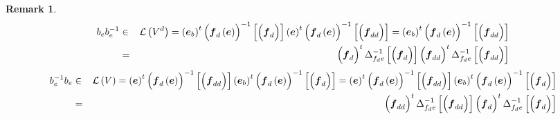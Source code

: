 \documentclass[aps,preprint]{revtex4}
\newtheorem{remark}[theorem]{Remark}
\begin{document}
\begin{remark}
\begin{eqnarray}
b_{e}b_{e}^{-1} &\in &\mathcal{L}\left( V^{d}\right) =\left( \overset{}{%
\boldsymbol{e}_{b}}\right) ^{t}\left( \overset{}{\boldsymbol{f}_{d}\left( 
\boldsymbol{e}\right) }\right) ^{-1}\left[ \left( \overset{}{\boldsymbol{f}%
_{d}}\right) \right] \left( \overset{}{\boldsymbol{e}}\right) ^{t}\left( 
\overset{}{\boldsymbol{f}_{d}\left( \boldsymbol{e}\right) }\right) ^{-1}%
\left[ \left( \overset{}{\boldsymbol{f}_{dd}}\right) \right] =\left( \overset%
{}{\boldsymbol{e}_{b}}\right) ^{t}\left( \overset{}{\boldsymbol{f}_{d}\left( 
\boldsymbol{e}\right) }\right) ^{-1}\left[ \left( \overset{}{\boldsymbol{f}%
_{dd}}\right) \right] \\
&=&\left( \overset{}{\boldsymbol{f}_{d}}\right) ^{t}{\LARGE \Delta }%
_{f_{d}e}^{-1}\left[ \left( \overset{}{\boldsymbol{f}_{d}}\right) \right]
\left( \overset{}{\boldsymbol{f}_{dd}}\right) ^{t}{\LARGE \Delta }%
_{f_{d}e}^{-1}\left[ \left( \overset{}{\boldsymbol{f}_{dd}}\right) \right]
\end{eqnarray}%
\begin{eqnarray}
b_{e}^{-1}b_{e} &\in &\mathcal{L}\left( V\right) =\left( \overset{}{%
\boldsymbol{e}}\right) ^{t}\left( \overset{}{\boldsymbol{f}_{d}\left( 
\boldsymbol{e}\right) }\right) ^{-1}\left[ \left( \overset{}{\boldsymbol{f}%
_{dd}}\right) \right] \left( \overset{}{\boldsymbol{e}_{b}}\right)
^{t}\left( \overset{}{\boldsymbol{f}_{d}\left( \boldsymbol{e}\right) }%
\right) ^{-1}\left[ \left( \overset{}{\boldsymbol{f}_{d}}\right) \right]
=\left( \overset{}{\boldsymbol{e}}\right) ^{t}\left( \overset{}{\boldsymbol{f%
}_{d}\left( \boldsymbol{e}\right) }\right) ^{-1}\left[ \left( \overset{}{%
\boldsymbol{f}_{dd}}\right) \right] \left( \overset{}{\boldsymbol{e}_{b}}%
\right) ^{t}\left( \overset{}{\boldsymbol{f}_{d}\left( \boldsymbol{e}\right) 
}\right) ^{-1}\left[ \left( \overset{}{\boldsymbol{f}_{d}}\right) \right] \\
&=&\left( \overset{}{\boldsymbol{f}_{dd}}\right) ^{t}{\LARGE \Delta }%
_{f_{d}e}^{-1}\left[ \left( \overset{}{\boldsymbol{f}_{dd}}\right) \right]
\left( \overset{}{\boldsymbol{f}_{d}}\right) ^{t}{\LARGE \Delta }%
_{f_{d}e}^{-1}\left[ \left( \overset{}{\boldsymbol{f}_{d}}\right) \right]
\end{eqnarray}
\end{remark}
\end{document}
